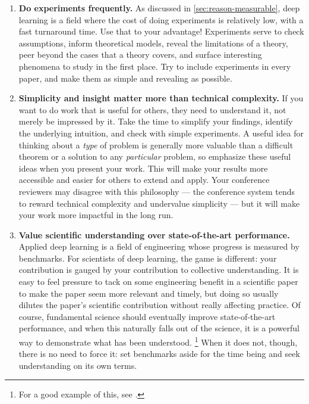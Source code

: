 \begin{enumerate}

    \item
    \textbf{Do experiments frequently.}
    As discussed in \cref{sec:reason-measurable}, deep learning is a field where the cost of doing experiments is relatively low, with a fast turnaround time.
    Use that to your advantage!
    Experiments serve to check assumptions, inform theoretical models, reveal the limitations of a theory, peer beyond the cases that a theory covers, and surface interesting phenomena to study in the first place.
    Try to include experiments in every paper, and make them as simple and revealing as possible.

    \item
    \textbf{Simplicity and insight matter more than technical complexity.}
    If you want to do work that is useful for others, they need to understand it, not merely be impressed by it.
    Take the time to simplify your findings, identify the underlying intuition, and check with simple experiments.
    A useful idea for thinking about a \textit{type} of problem is generally more valuable than a difficult theorem or a solution to any \textit{particular} problem, so emphasize these useful ideas when you present your work.
    This will make your results more accessible and easier for others to extend and apply.
    Your conference reviewers may disagree with this philosophy --- the conference system tends to reward technical complexity and undervalue simplicity --- but it will make your work more impactful in the long run.


    \item
    \textbf{Value scientific understanding over state-of-the-art performance.}
    Applied deep learning is a field of engineering whose progress is measured by benchmarks.
    For scientists of deep learning, the game is different: your contribution is gauged by your contribution to collective understanding.
    It is easy to feel pressure to tack on some engineering benefit in a scientific paper to make the paper seem more relevant and timely, but doing so usually dilutes the paper's scientific contribution without really affecting practice.
    Of course, fundamental science should eventually improve state-of-the-art performance, and when this naturally falls out of the science, it is a powerful way to demonstrate what has been understood.%
    \footnote{For a good example of this, see \citet{yang2022tensor}.}
    When it does not, though, there is no need to force it: set benchmarks aside for the time being and seek understanding on its own terms.


\end{enumerate}
